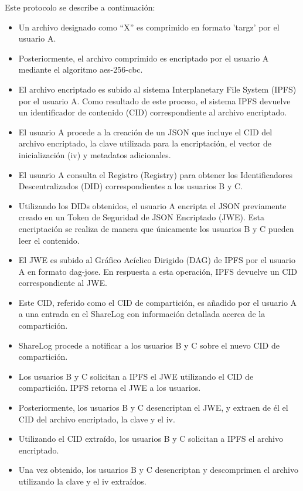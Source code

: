 Este protocolo se describe a continuación:
\begin{itemize}[noitemsep,after=\vspace{-0.4\baselineskip}]
  \item Un archivo designado como ``X'' es comprimido en formato 'targz' por el usuario A.
  \item Posteriormente, el archivo comprimido es encriptado por el usuario A mediante el algoritmo aes-256-cbc.
  \item El archivo encriptado es subido al sistema Interplanetary File System (IPFS) por el usuario A. Como resultado de este proceso, el sistema IPFS devuelve un identificador de contenido (CID) correspondiente al archivo encriptado.
  \item El usuario A procede a la creación de un JSON que incluye el CID del archivo encriptado, la clave utilizada para la encriptación, el vector de inicialización (iv) y metadatos adicionales.
  \item El usuario A consulta el Registro (Registry) para obtener los Identificadores Descentralizados (DID) correspondientes a los usuarios B y C.
  \item Utilizando los DIDs obtenidos, el usuario A encripta el JSON previamente creado en un Token de Seguridad de JSON Encriptado (JWE). Esta encriptación se realiza de manera que únicamente los usuarios B y C pueden leer el contenido.
  \item El JWE es subido al Gráfico Acíclico Dirigido (DAG) de IPFS por el usuario A en formato dag-jose. En respuesta a esta operación, IPFS devuelve un CID correspondiente al JWE.
  \item Este CID, referido como el CID de compartición, es añadido por el usuario A a una entrada en el ShareLog con información detallada acerca de la compartición.
  \item ShareLog procede a notificar a los usuarios B y C sobre el nuevo CID de compartición.
  \item Los usuarios B y C solicitan a IPFS el JWE utilizando el CID de compartición. IPFS retorna el JWE a los usuarios.
  \item Posteriormente, los usuarios B y C desencriptan el JWE, y extraen de él el CID del archivo encriptado, la clave y el iv.
  \item Utilizando el CID extraído, los usuarios B y C solicitan a IPFS el archivo encriptado.
  \item Una vez obtenido, los usuarios B y C desencriptan y descomprimen el archivo utilizando la clave y el iv extraídos.
\end{itemize}

